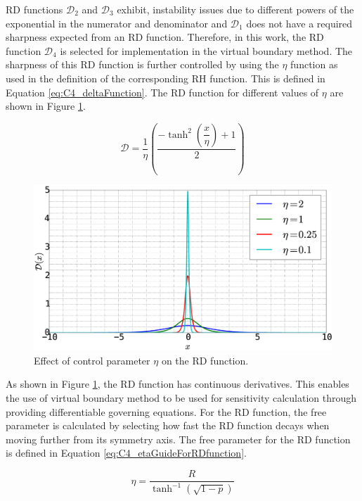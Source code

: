 RD functions $\mathcal{D}_2$ and $\mathcal{D}_3$ exhibit, instability issues due to different powers of the exponential in the numerator and denominator and $\mathcal{D}_1$ does not have a required sharpness expected from an RD function. Therefore, in this work, the RD function $\mathcal{D}_4$ is selected for implementation in the virtual boundary method. The sharpness of this RD function is further controlled by using the $\eta$ function as used in the definition of the corresponding RH function. This is defined in Equation \eqref{eq:C4_deltaFunction}. The RD function for different values of $\eta$ are shown in Figure \ref{fig:C4_deltaFunctionWithControlParamter}.

\begin{equation}\label{eq:C4_deltaFunction}
    \mathcal{D} = \dfrac{1}{\eta} \left( \dfrac{-\tanh^{2}{\left (\dfrac{x}{\eta} \right )} + 1}{2} \right)
\end{equation}

\begin{figure}[H]
    \centering
    \includegraphics[width=12.00cm]{Chapter_4/figure/delta_function_with_control.eps}
    \caption{Effect of control parameter $\eta$ on the RD function.}
    \label{fig:C4_deltaFunctionWithControlParamter}
\end{figure}

As shown in Figure \ref{fig:C4_deltaFunctionWithControlParamter}, the RD function has continuous derivatives. This enables the use of virtual boundary method to be used for sensitivity calculation through providing differentiable governing equations. For the RD function, the free parameter is calculated by selecting how fast the RD function decays when moving further from its symmetry axis. The free parameter for the RD function is defined in Equation \eqref{eq:C4_etaGuideForRDfunction}.

\begin{equation}\label{eq:C4_etaGuideForRDfunction}
    \eta = \frac{R}{\tanh^{-1} (\sqrt{1 - p})}
\end{equation}

